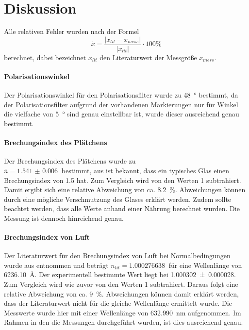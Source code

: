 \section{Diskussion}
\label{sec:Diskussion}
Alle relativen Fehler wurden nach der Formel
\begin{equation*}
  \tilde{x} = \frac{ \lvert x_{lit} - x_{mess} \rvert}{\lvert x_{lit} \rvert}
  \cdot 100 \%
\end{equation*}
berechnet, dabei bezeichnet $x_{lit}$ den Literaturwert der Messgröße $x_{mess}$. 
\paragraph{Polarisationswinkel}
Der Polarisationswinkel für den Polarisationsfilter wurde zu \SI{48}{\degree} bestimmt, da der 
Polarisationsfilter aufgrund der vorhandenen Markierungen nur für Winkel 
die vielfache von \SI{5}{\degree} sind genau einstellbar ist, wurde 
dieser ausreichend genau bestimmt.
\paragraph{Brechungsindex des Plätchens} 
Der Brechungsindex des Plätchens wurde zu \\$\bar{n} = \SI{1.541(6)}{}$ bestimmt, aus 
\cite{Anleitung} ist bekannt, dass ein typisches Glas einen Brechungsindex von \SI{1.5}{} hat. 
Zum Vergleich wird von den Werten 1 subtrahiert. 
Damit ergibt sich eine relative Abweichung von ca. \SI{8.2}{\percent}. Abweichungen können durch eine 
mögliche Verschmutzung des Glases erklärt werden. Zudem sollte beachtet werden, dass alle Werte anhand einer 
Nährung berechnet wurden. Die Messung ist dennoch hinreichend genau.
\paragraph{Brechungsindex von Luft} 
Der Literaturwert für den Brechungsindex von Luft bei Normalbedingungen wurde aus 
\cite{brechlit} entnommen und beträgt $n_{lit} = \SI{1.000276638}{}$ für eine Wellenlänge von 
\SI{6236.10}{\angstrom}. Der experimentell bestimmte Wert liegt bei \SI{1.000302(28)}{}. Zum Vergleich 
wird wie zuvor von den Werten 1 subtrahiert.
Daraus folgt eine relative Abweichung von ca. \SI{9}{\percent}. Abweichungen können damit erklärt werden, dass 
der Literaturwert nicht für die gleiche Wellenlänge ermittelt wurde. Die Messwerte wurde hier mit einer 
Wellenlänge von \SI{632.990}{\nano\meter} aufgenommen. Im Rahmen in den die Messungen durchgeführt wurden, 
ist dies ausreichend genau. 
